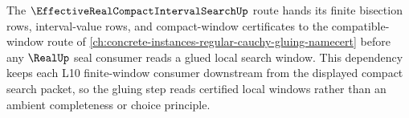 The $\EffectiveRealCompactIntervalSearchUp$ route hands its finite bisection rows, interval-value rows, and compact-window certificates to the compatible-window route of \autoref{ch:concrete-instances-regular-cauchy-gluing-namecert} before any $\RealUp$ seal consumer reads a glued local search window. This dependency keeps each L10 finite-window consumer downstream from the displayed compact search packet, so the gluing step reads certified local windows rather than an ambient completeness or choice principle.
